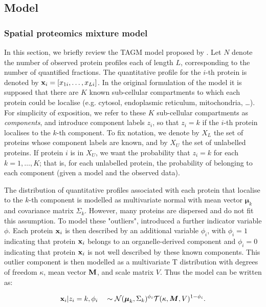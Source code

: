 \documentclass[12pt,english]{article}
\begin{document}
\subsection{Model}
\subsubsection{Spatial proteomics mixture model}
In this section, we briefly review the TAGM model proposed by \citep{Crook:2018}. Let $N$ denote the number of observed protein profiles each of length $L$, corresponding to
the number of quantified fractions. The quantitative profile for the $i$-th protein is denoted by ${\bf x}_i = [x_{1i}, \ldots, x_{Li}]$.  In the original formulation of the model it is supposed that there are $K$
known sub-cellular compartments to which each protein could be localise
(e.g. cytosol, endoplasmic reticulum, mitochondria, \ldots). For simplicity of exposition, we refer to these $K$ sub-cellular compartments as {\em
	components}, and introduce component labels $z_i$, so that $z_i = k$
if the $i$-th protein localises to the $k$-th component. To fix notation, we denote by
$X_L$ the set of proteins whose component labels are known, and by
$X_U$ the set of unlabelled proteins.  If protein $i$ is in $X_U$, we
want the probability that $z_i = k$ for each $k = 1, \ldots, K$;
that is, for each unlabelled protein, the probability of
belonging to each component (given a model and the observed data).


The distribution of quantitative profiles associated with each
protein that localise to the $k$-th component is modelled as multivariate normal
with mean vector $\boldsymbol{\mu}_k$ and covariance matrix
$\Sigma_k$. However, many proteins are dispersed and do not fit this assumption. To model these "outliers", \cite{Crook:2018} introduced a further indicator variable $\phi$. Each protein ${\bf x}_i$ is then described by an additional variable $\phi_i$, with $\phi_i = 1$ indicating that protein ${\bf x}_i$ belongs to an
organelle-derived component and $\phi_i = 0$ indicating that protein
${\bf x}_i$ is not well described by these known components. This
outlier component is then modelled as a multivariate T distribution with
degrees of freedom $\kappa$, mean vector $\bf{M}$, and scale matrix
$V$. Thus the model can be written as:

\begin{align}
{\bf x}_i | z_i = k, \phi_i \quad \sim \mathcal{N}(\boldsymbol{\mu}_k, \Sigma_k)^{\phi_i}\mathcal{T}(\kappa, \boldsymbol{M}, V)^{1 - \phi_i }.
\end{align}
\end{document}
